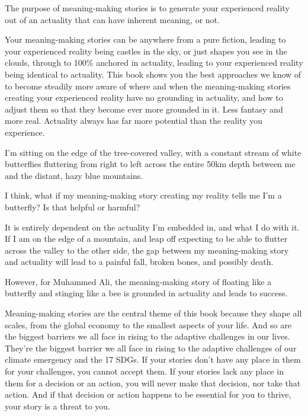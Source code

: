 The purpose of meaning-making stories is to generate your experienced reality out of an actuality that can have inherent meaning, or not.


Your meaning-making stories can be anywhere from a pure fiction, leading to your experienced reality being castles in the sky, or just shapes you see in the clouds, through to 100\% anchored in actuality, leading to your experienced reality being identical to actuality. This book shows you the best approaches we know of to become steadily more aware of where and when the meaning-making stories creating your experienced reality have no grounding in actuality, and how to adjust them so that they become ever more grounded in it. Less fantasy and more real. Actuality always has far more potential than the reality you experience.


\begin{longstoryblock}
I'm sitting on the edge of the tree-covered valley, with a constant stream of white butterflies fluttering from right to left across the entire 50km depth between me and the distant, hazy blue mountains. 


I think, what if my meaning-making story creating my reality tells me I'm a butterfly? Is that helpful or harmful? 


It is entirely dependent on the actuality I'm embedded in, and what I do with it. If I am on the edge of a mountain, and leap off expecting to be able to flutter across the valley to the other side, the gap between my meaning-making story and actuality will lead to a painful fall, broken bones, and possibly death. 


However, for Muhammed Ali, the meaning-making story of floating like a butterfly and stinging like a bee is grounded in actuality and leads to success.
\end{longstoryblock}


Meaning-making stories are the central theme of this book because they shape all scales, from the global economy to the smallest aspects of your life. And so are the biggest barriers we all face in rising to the adaptive challenges in our lives. They’re the biggest barrier we all face in rising to the adaptive challenges of our climate emergency and the 17 SDGs. If your stories don't have any place in them for your challenges, you cannot accept them. If your stories lack any place in them for a decision or an action, you will never make that decision, nor take that action. And if that decision or action happens to be essential for you to thrive, your story is a threat to you. 


